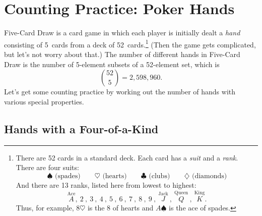 \begin{problems}
\classproblems
{}
\end{problems}


\section{Counting Practice: Poker Hands}\label{poker_hands_sec}

Five-Card Draw is a card game in which each player is initially dealt
a \emph{hand} consisting of 5~cards from a deck of
52~cards.\footnote{There are 52 cards in a standard deck.  Each card
  has a \emph{suit} and a \emph{rank}.  There are four suits:
%
\[
\spadesuit   \text{ (spades)} \qquad
\heartsuit   \text{ (hearts)} \qquad
\clubsuit    \text{ (clubs)} \qquad
\diamondsuit \text{ (diamonds)}
\]
%
And there are 13 ranks, listed here from lowest to highest:
%
\[
\stackrel{\text{Ace}}{A},\
2\ ,\ 3\ ,\ 4\ ,\ 5\ ,\ 6\ ,\ 7\ ,\ 8\ ,\ 9\ ,\
\stackrel{\text{Jack}}{J}\ ,\
\stackrel{\text{Queen}}{Q}\ ,\
\stackrel{\text{King}}{K}.
\]
%
Thus, for example, $8 \heartsuit$ is the 8 of hearts and $A
\spadesuit$ is the ace of spades.}  (Then the game gets complicated,
but let's not worry about that.)  The number of different hands in
Five-Card Draw is the number of 5-element subsets of a 52-element set,
which is
%
\[
\binom{52}{5} = 2,598,960.
\]
%
Let's get some counting practice by working out the number of hands
with various special properties.

\subsection{Hands with a Four-of-a-Kind}

